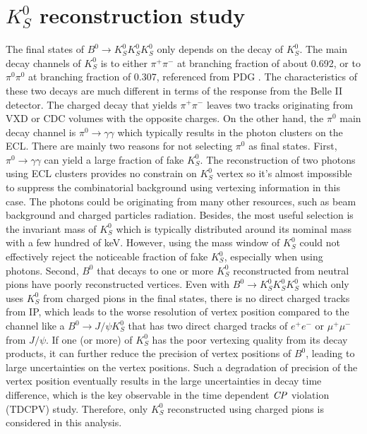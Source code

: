 \chapter{$K_S^0$ reconstruction study}

The final states of $B^0 \to K_S^0  K_S^0  K_S^0 $ only depends on the decay of $K_S^0$. The main decay channels of $K_S^0$ is to either $\pi^+ \pi^-$ at branching fraction of about 0.692, or to $\pi^0 \pi^0$ at branching fraction of 0.307, referenced from PDG \cite{pdg}.
 The characteristics of these two decays are much different in terms of the response from the Belle II detector. The charged decay that yields  $\pi^+ \pi^-$ leaves two tracks originating from VXD or CDC volumes with the opposite charges. On the other hand, the $\pi^0$ main decay channel is $\pi^0 \to \gamma \gamma$ which typically results in the photon clusters on the ECL. There are mainly two reasons for not selecting $\pi^0$ as final states.
 First, $\pi^0 \to \gamma \gamma$ can yield a large fraction of fake $K_S^0$. The reconstruction of two photons using ECL clusters provides no constrain on $K_S^0$ vertex so it's almost impossible to suppress the combinatorial background using vertexing information in this case. The photons could be originating from many other resources, such as beam background and charged particles radiation. Besides, the most useful selection is the invariant mass of $K_S^0$ which is typically distributed around its nominal mass with a few hundred of keV. However, using the mass window of $K_S^0$ could not effectively reject the noticeable fraction of fake $K_S^0$, especially when using photons. Second, $B^0$ that decays to one or more $K_S^0$ reconstructed from neutral pions have poorly reconstructed vertices. Even with $B^0 \to K_S^0  K_S^0  K_S^0 $ which only uses $K_S^0$ from charged pions in the final states, there is no direct charged tracks from IP, which leads to the worse resolution of vertex position compared to the channel like a $B^0 \to J/\psi K_S^0$ that has two direct charged tracks of $e^+e^-$ or $\mu^+ \mu^-$ from $J/\psi$. If one (or more) of $K^0_S$ has the poor vertexing quality from its decay products, it can further reduce the precision of vertex positions of $B^0$, leading to large uncertainties on the vertex positions. Such a degradation of precision of the vertex position eventually results in the large uncertainties in decay time difference, which is the key observable in the time dependent $\it{CP}$ violation (TDCPV) study. Therefore, only $K_S^0$ reconstructed using charged pions is considered in this analysis.
 
